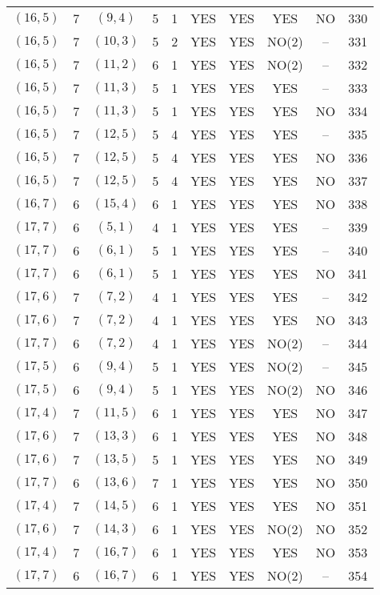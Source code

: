 \begin{longtable}{|c|c|c|c|c|c|c|c|c|c|}
$(16, 5)$ & 7 & $(9, 4)$ & 5 & 1 & YES & YES & YES & NO & 330\\
$(16, 5)$ & 7 & $(10, 3)$ & 5 & 2 & YES & YES & NO(2) & -- & 331\\
$(16, 5)$ & 7 & $(11, 2)$ & 6 & 1 & YES & YES & NO(2) & -- & 332\\
$(16, 5)$ & 7 & $(11, 3)$ & 5 & 1 & YES & YES & YES & -- & 333\\
$(16, 5)$ & 7 & $(11, 3)$ & 5 & 1 & YES & YES & YES & NO & 334\\
$(16, 5)$ & 7 & $(12, 5)$ & 5 & 4 & YES & YES & YES & -- & 335\\
$(16, 5)$ & 7 & $(12, 5)$ & 5 & 4 & YES & YES & YES & NO & 336\\
$(16, 5)$ & 7 & $(12, 5)$ & 5 & 4 & YES & YES & YES & NO & 337\\
$(16, 7)$ & 6 & $(15, 4)$ & 6 & 1 & YES & YES & YES & NO & 338\\
$(17, 7)$ & 6 & $(5, 1)$ & 4 & 1 & YES & YES & YES & -- & 339\\
$(17, 7)$ & 6 & $(6, 1)$ & 5 & 1 & YES & YES & YES & -- & 340\\
$(17, 7)$ & 6 & $(6, 1)$ & 5 & 1 & YES & YES & YES & NO & 341\\
$(17, 6)$ & 7 & $(7, 2)$ & 4 & 1 & YES & YES & YES & -- & 342\\
$(17, 6)$ & 7 & $(7, 2)$ & 4 & 1 & YES & YES & YES & NO & 343\\
$(17, 7)$ & 6 & $(7, 2)$ & 4 & 1 & YES & YES & NO(2) & -- & 344\\
$(17, 5)$ & 6 & $(9, 4)$ & 5 & 1 & YES & YES & NO(2) & -- & 345\\
$(17, 5)$ & 6 & $(9, 4)$ & 5 & 1 & YES & YES & NO(2) & NO & 346\\
$(17, 4)$ & 7 & $(11, 5)$ & 6 & 1 & YES & YES & YES & NO & 347\\
$(17, 6)$ & 7 & $(13, 3)$ & 6 & 1 & YES & YES & YES & NO & 348\\
$(17, 6)$ & 7 & $(13, 5)$ & 5 & 1 & YES & YES & YES & NO & 349\\
$(17, 7)$ & 6 & $(13, 6)$ & 7 & 1 & YES & YES & YES & NO & 350\\
$(17, 4)$ & 7 & $(14, 5)$ & 6 & 1 & YES & YES & YES & NO & 351\\
$(17, 6)$ & 7 & $(14, 3)$ & 6 & 1 & YES & YES & NO(2) & NO & 352\\
$(17, 4)$ & 7 & $(16, 7)$ & 6 & 1 & YES & YES & YES & NO & 353\\
$(17, 7)$ & 6 & $(16, 7)$ & 6 & 1 & YES & YES & NO(2) & -- & 354\\

\end{longtable}
